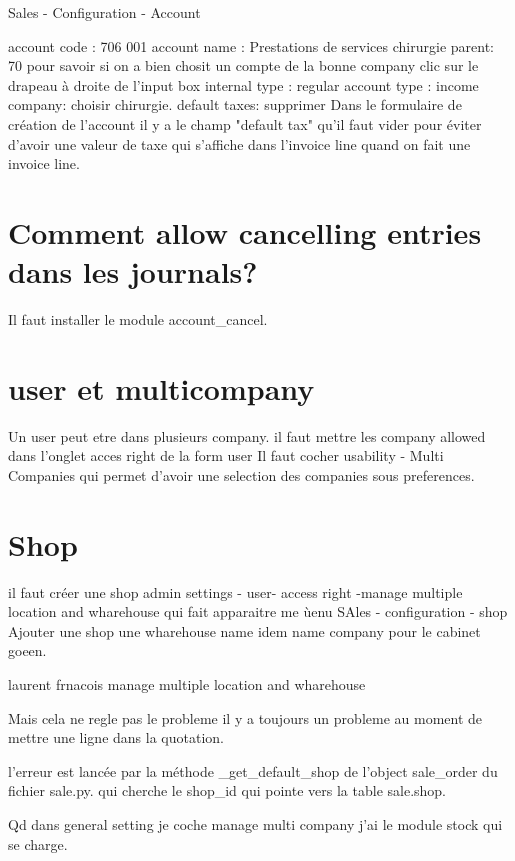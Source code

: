 \documentclass[12pt,a4paper]{article}
\begin{document}
Sales - Configuration - Account

account code : 706 001
account name : Prestations de services chirurgie
parent: 70 pour savoir si on a bien chosit un compte de la bonne company clic sur le drapeau à droite de l'input box
internal type : regular
account type : income 
company: choisir chirurgie. 
default taxes: supprimer
Dans le formulaire de création de l'account il y a le champ "default tax" qu'il faut vider pour éviter d'avoir une valeur de taxe qui s'affiche dans l'invoice line quand on fait une invoice line.




\section{Comment allow cancelling entries dans les journals?}
\label{sec:cancelling_entries}

Il faut installer le module account\_cancel.

\section{user et multicompany}
\label{sec:user_multicompany}

Un user peut etre dans plusieurs company. 
il faut mettre les company allowed dans l'onglet acces right de la form user 
Il faut cocher usability - Multi Companies qui permet d'avoir une selection des companies sous preferences. 

\section{Shop}
\label{sec:shop}

il faut créer une shop 
admin settings - user- access right -manage multiple location and wharehouse
qui fait apparaitre me ùenu SAles - configuration - shop 
Ajouter une shop une wharehouse name idem name company pour le cabinet goeen.

laurent frnacois manage multiple location and wharehouse

Mais cela ne regle pas le probleme il y a toujours un probleme au moment de mettre une ligne dans la quotation. 

l'erreur est lancée par la méthode \_get\_default\_shop de l'object sale\_order du fichier sale.py.
qui cherche le shop\_id qui pointe vers la table sale.shop.


Qd dans general setting je coche manage multi company j'ai le module stock qui se charge. 
\end{document}
